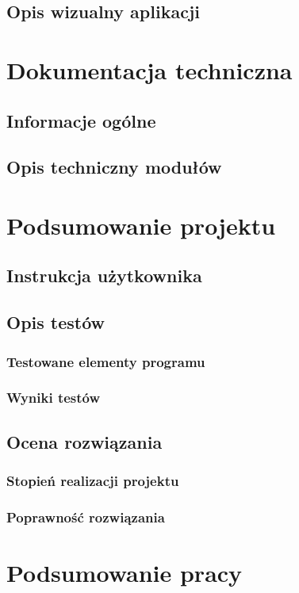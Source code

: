 \documentclass[12pt, oneside]{report}
\theoremstyle{definition}
\begin{document}
\section{Opis wizualny aplikacji}


\newpage
\chapter{Dokumentacja techniczna}
\section{Informacje ogólne} 
\section{Opis techniczny modułów}


\newpage
\chapter{Podsumowanie projektu}
\section{Instrukcja użytkownika}
\section{Opis testów}
\subsection{Testowane elementy programu}
\subsection{Wyniki testów}
\section{Ocena rozwiązania}
\subsection{Stopień realizacji projektu}
\subsection{Poprawność rozwiązania}

	
\newpage
\chapter{Podsumowanie pracy}
\end{document}
